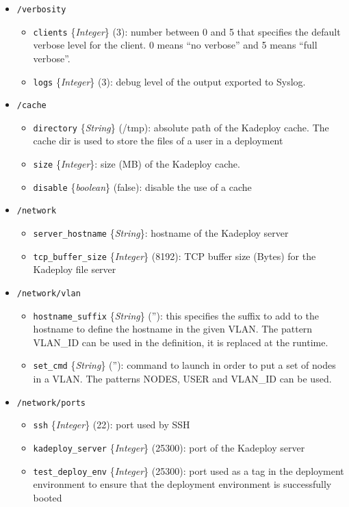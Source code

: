 \documentclass[a4wide,10pt,oneside]{book}
\newcommand{\ypath}[1]{\texttt{#1}}
\newcommand{\yfield}[2]{\texttt{#1} {\small\{{\emph{#2}}\}}:}
\newcommand{\yfieldd}[3]{\texttt{#1} {\small\{{\emph{#2}}\}} {\small(}#3{\small)}:}
\begin{document}
\begin{itemize}
  \item \ypath{/verbosity}
  \begin{itemize}
    \item \yfieldd{clients}{Integer}{3} number between 0 and 5 that specifies the default verbose level for the client. 0 means ``no verbose'' and 5 means ``full verbose''.
    \item \yfieldd{logs}{Integer}{3} debug level of the output exported to Syslog.
  \end{itemize}

  \item \ypath{/cache}
  \begin{itemize}
    \item \yfieldd{directory}{String}{/tmp} absolute path of the Kadeploy cache. The cache dir is used to store the files of a user in a deployment
    \item \yfield{size}{Integer} size (MB) of the Kadeploy cache.
    \item \yfieldd{disable}{boolean}{false} disable the use of a cache
  \end{itemize}

  \item \ypath{/network}
  \begin{itemize}
    \item \yfield{server\_hostname}{String} hostname of the Kadeploy server
    \item \yfieldd{tcp\_buffer\_size}{Integer}{8192} TCP buffer size (Bytes) for the Kadeploy file server
  \end{itemize}

  \item \ypath{/network/vlan}
  \begin{itemize}
    \item \yfieldd{hostname\_suffix}{String}{''} this specifies the suffix to add to the hostname to define the hostname in the given VLAN. The pattern VLAN\_ID can be used in the definition, it is replaced at the runtime.
    \item \yfieldd{set\_cmd}{String}{''} command to launch in order to put a set of nodes in a VLAN. The patterns NODES, USER and VLAN\_ID can be used.
  \end{itemize}

  \item \ypath{/network/ports}
  \begin{itemize}
    \item \yfieldd{ssh}{Integer}{22} port used by SSH
    \item \yfieldd{kadeploy\_server}{Integer}{25300} port of the Kadeploy server
    \item \yfieldd{test\_deploy\_env}{Integer}{25300} port used as a tag in the deployment environment to ensure that the deployment environment is successfully booted
  \end{itemize}


\end{itemize}
\end{document}
